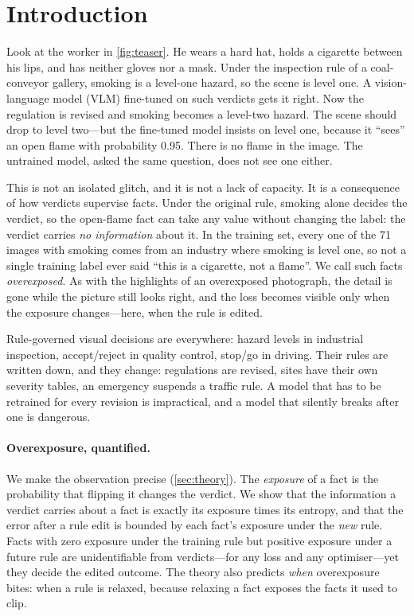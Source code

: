 \section{Introduction}
\label{sec:intro}

Look at the worker in \cref{fig:teaser}. He wears a hard hat, holds a cigarette between his lips, and has neither gloves nor a mask. Under the inspection rule of a coal-conveyor gallery, smoking is a level-one hazard, so the scene is level one. A vision-language model (VLM) fine-tuned on such verdicts gets it right. Now the regulation is revised and smoking becomes a level-two hazard. The scene should drop to level two---but the fine-tuned model insists on level one, because it ``sees'' an open flame with probability 0.95. There is no flame in the image. The untrained model, asked the same question, does not see one either.

This is not an isolated glitch, and it is not a lack of capacity. It is a consequence of how verdicts supervise facts. Under the original rule, smoking alone decides the verdict, so the open-flame fact can take any value without changing the label: the verdict carries \emph{no information} about it. In the training set, every one of the 71 images with smoking comes from an industry where smoking is level one, so not a single training label ever said ``this is a cigarette, not a flame''. We call such facts \emph{overexposed}. As with the highlights of an overexposed photograph, the detail is gone while the picture still looks right, and the loss becomes visible only when the exposure changes---here, when the rule is edited.

Rule-governed visual decisions are everywhere: hazard levels in industrial inspection, accept/reject in quality control, stop/go in driving. Their rules are written down, and they change: regulations are revised, sites have their own severity tables, an emergency suspends a traffic rule. A model that has to be retrained for every revision is impractical, and a model that silently breaks after one is dangerous.

\paragraph{Overexposure, quantified.} We make the observation precise (\cref{sec:theory}). The \emph{exposure} of a fact is the probability that flipping it changes the verdict. We show that the information a verdict carries about a fact is exactly its exposure times its entropy, and that the error after a rule edit is bounded by each fact's exposure under the \emph{new} rule. Facts with zero exposure under the training rule but positive exposure under a future rule are unidentifiable from verdicts---for any loss and any optimiser---yet they decide the edited outcome. The theory also predicts \emph{when} overexposure bites: when a rule is relaxed, because relaxing a fact exposes the facts it used to clip.

